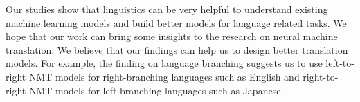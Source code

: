 \documentclass[11pt,a4paper]{article}
\begin{document}

Our studies show that linguistics can be very helpful to understand existing machine learning models and build better models for language related tasks. We hope that our work can bring some insights to the research on neural machine translation. We believe that our findings can help us to design better translation models. For example, the finding on language branching suggests us to use left-to-right NMT models for right-branching languages such as English and right-to-right NMT models for left-branching languages such as Japanese.
\end{document}
